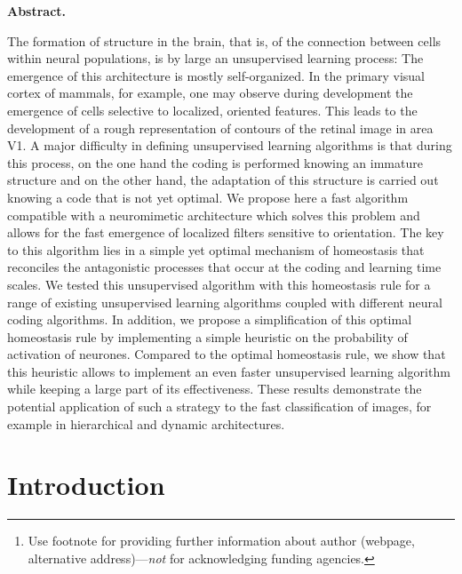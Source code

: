 \documentclass[a4paper, 11pt]{article} %
\title{\Title}
\author{%
\FirstNameA\ \AuthorA \and \FirstNameB\ \AuthorB \and \FirstNameC\ \AuthorC
}
\date{\Institute\ \\ 
\Organism\
}
\author{
David S.~Hippocampus\thanks{Use footnote for providing further
information about author (webpage, alternative
address)---\emph{not} for acknowledging funding agencies.} \\
Department of Computer Science\\
Cranberry-Lemon University\\
Pittsburgh, PA 15213 \\
\texttt{hippo@cs.cranberry-lemon.edu} \\
}
\newcommand{\Abstract}{
The formation of structure in the brain, that is, of the connection
between cells within neural populations, is by large an unsupervised
learning process: The emergence of this architecture is
mostly self-organized. In the primary visual cortex of mammals, for
example, one may observe during development the emergence of cells
selective to localized, oriented features. This leads to the development
of a rough representation of contours of the retinal image in area V1. A
major difficulty in defining unsupervised learning algorithms is that
during this process, on the one hand the coding is performed knowing an
immature structure and on the other hand, the adaptation of this
structure is carried out knowing a code that is not yet optimal. We
propose here a fast algorithm compatible with a neuromimetic
architecture which solves this problem and allows for the fast emergence
of localized filters sensitive to orientation. The key to this algorithm
lies in a simple yet optimal mechanism of homeostasis that reconciles
the antagonistic processes that occur at the coding and learning time scales.
We tested this unsupervised algorithm with this homeostasis rule for a
range of existing unsupervised learning algorithms coupled with
different neural coding algorithms. In addition, we propose a
simplification of this optimal homeostasis rule by implementing a simple
heuristic on the probability of activation of neurones. Compared to the optimal homeostasis rule, we show that this heuristic allows to implement an even faster unsupervised learning algorithm while keeping a large part of its effectiveness. These results demonstrate the potential application of such a strategy to the fast classification of images, for example in hierarchical and dynamic architectures.
}
\begin{document}
%
\maketitle
%
%

\vspace*{-.6cm}
{\bf Abstract.}
\Abstract
\vspace*{-.4cm}
\thispagestyle{empty}

%
%

\section{Introduction}\label{introduction}
\end{document}
